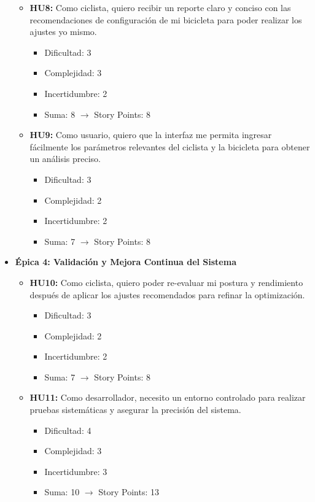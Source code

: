 \documentclass[
11pt, %
]{charter}
\begin{document}
\begin{itemize}
    \begin{itemize}
      \item \textbf{HU8:} Como ciclista, quiero recibir un reporte claro y conciso con las recomendaciones de configuración de mi bicicleta para poder realizar los ajustes yo mismo.
        \begin{itemize}
          \item Dificultad: 3
          \item Complejidad: 3
          \item Incertidumbre: 2
          \item Suma: 8 $\rightarrow$ Story Points: 8
        \end{itemize}
      \item \textbf{HU9:} Como usuario, quiero que la interfaz me permita ingresar fácilmente los parámetros relevantes del ciclista y la bicicleta para obtener un análisis preciso.
        \begin{itemize}
          \item Dificultad: 3
          \item Complejidad: 2
          \item Incertidumbre: 2
          \item Suma: 7 $\rightarrow$ Story Points: 8
        \end{itemize}
    \end{itemize}
  \item \textbf{Épica 4: Validación y Mejora Continua del Sistema}
    \begin{itemize}
      \item \textbf{HU10:} Como ciclista, quiero poder re-evaluar mi postura y rendimiento después de aplicar los ajustes recomendados para refinar la optimización.
        \begin{itemize}
          \item Dificultad: 3
          \item Complejidad: 2
          \item Incertidumbre: 2
          \item Suma: 7 $\rightarrow$ Story Points: 8
        \end{itemize}
      \item \textbf{HU11:} Como desarrollador, necesito un entorno controlado para realizar pruebas sistemáticas y asegurar la precisión del sistema.
        \begin{itemize}
          \item Dificultad: 4
          \item Complejidad: 3
          \item Incertidumbre: 3
          \item Suma: 10 $\rightarrow$ Story Points: 13
        \end{itemize}
    \end{itemize}
\end{itemize}
\end{document}
